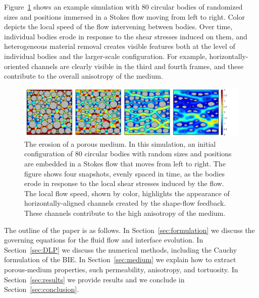 \documentclass[3p]{elsarticle}
\begin{document}
Figure~\ref{fig1} shows an example simulation with 80 circular bodies of randomized sizes and positions immersed in a Stokes flow moving from left to right. 
Color depicts the local speed of the flow intervening between bodies. Over time, individual bodies erode in response to the shear stresses induced on them, and heterogeneous material removal creates visible features both at the level of individual bodies and the larger-scale configuration. For example, horizontally-oriented channels are clearly visible in the third and fourth frames, and these contribute to the overall anisotropy of the medium.


\begin{figure}%
\centering
\includegraphics[width = 0.99 \textwidth]{./figs/Velocity-80-4.pdf}
\caption{The erosion of a porous medium. In this simulation, an initial configuration of 80 circular bodies with random sizes and positions are embedded in a Stokes flow that moves from left to right. The figure shows four snapshots, evenly spaced in time, as the bodies erode in response to the local shear stresses induced by the flow. The local flow speed, shown by color, highlights the appearance of horizontally-aligned channels created by the shape-flow feedback. These channels contribute to the high anisotropy of the medium.
\label{fig1}
}
\end{figure}

The outline of the paper is as follows. In Section~\ref{sec:formulation} we discuss the governing equations for the fluid flow and interface evolution. In Section~\ref{sec:DLP} we discuss the numerical methods, including the Cauchy formulation of the BIE. In Section~\ref{sec:medium} we explain how to extract porous-medium properties, such permeability, anisotropy, and tortuosity. In Section~\ref{sec:results} we provide results and we conclude in Section~\ref{sec:conclusion}.
\end{document}
